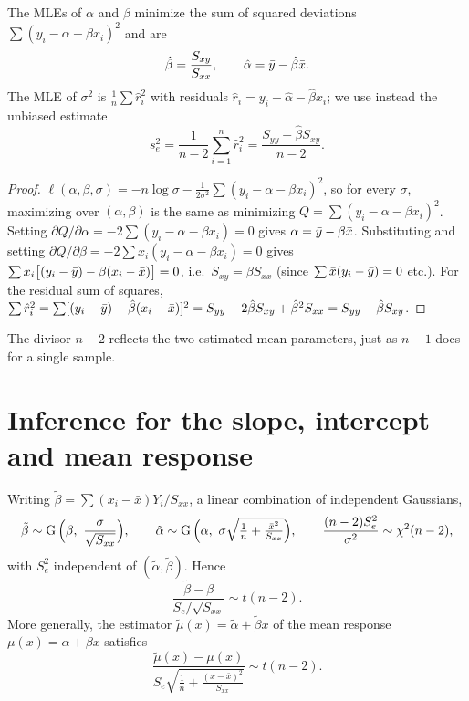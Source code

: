 \begin{theorem}[Least squares $=$ maximum likelihood]
The MLEs of $\alpha$ and $\beta$ minimize the sum of squared deviations
$\sum(y_i - \alpha-\beta x_i)^2$ and are
\[
\hat\beta = \frac{S_{xy}}{S_{xx}},\qquad \hat\alpha = \bar{y} - \hat\beta\bar x.
\]
The MLE of $\sigma^2$ is $\frac1n\sum \hat r_i^2$ with residuals
$\hat r_i = y_i - \hat\alpha - \hat\beta x_i$; we use instead the unbiased estimate
\[
s_e^2 = \frac{1}{n-2}\sum_{i=1}^n \hat r_i^2 = \frac{S_{yy} - \hat\beta S_{xy}}{n-2}.
\]
\end{theorem}
\begin{proof}
$\ell(\alpha,\beta,\sigma) = -n\log\sigma - \frac{1}{2\sigma^2}\sum(y_i-\alpha-\beta x_i)^2$,
so for every $\sigma$, maximizing over $(\alpha,\beta)$ is the same as minimizing
$Q = \sum(y_i-\alpha-\beta x_i)^2$. Setting
$\partial Q/\partial\alpha = -2\sum(y_i-\alpha-\beta x_i) = 0$ gives $\alpha = \bar{y} - \beta\bar x$.
Substituting and setting $\partial Q/\partial\beta = -2\sum x_i(y_i-\alpha-\beta x_i) = 0$
gives $\sum x_i\big[(y_i-\bar{y}) - \beta(x_i-\bar x)\big] = 0$, i.e.\ $S_{xy} = \beta S_{xx}$
(since $\sum\bar x(y_i-\bar{y}) = 0$ etc.). For the residual sum of squares,
$\sum\hat r_i^2 = \sum[(y_i-\bar{y})-\hat\beta(x_i-\bar x)]^2 = S_{yy} - 2\hat\beta S_{xy} +
\hat\beta^2S_{xx} = S_{yy}-\hat\beta S_{xy}$.
\end{proof}

The divisor $n-2$ reflects the two estimated mean parameters, just as $n-1$ does for
a single sample.

\section{Inference for the slope, intercept and mean response}

\begin{theorem}
Writing $\tilde\beta = \sum (x_i-\bar x)Y_i/S_{xx}$, a linear combination of independent
Gaussians,
\[
\tilde\beta\sim\Gau\Big(\beta,\ \frac{\sigma}{\sqrt{S_{xx}}}\Big),\qquad
\tilde\alpha\sim\Gau\Big(\alpha,\ \sigma\sqrt{\tfrac1n + \tfrac{\bar x^2}{S_{xx}}}\Big),
\qquad
\frac{(n-2)S_e^2}{\sigma^2}\sim\chi^2(n-2),
\]
with $S_e^2$ independent of $(\tilde\alpha,\tilde\beta)$. Hence
\[
\frac{\tilde\beta-\beta}{S_e/\sqrt{S_{xx}}}\sim t(n-2).
\]
More generally, the estimator $\tilde\mu(x) = \tilde\alpha+\tilde\beta x$ of the mean
response $\mu(x) = \alpha+\beta x$ satisfies
\[
\frac{\tilde\mu(x)-\mu(x)}{S_e\sqrt{\frac1n + \frac{(x-\bar x)^2}{S_{xx}}}}\sim t(n-2).
\]
\end{theorem}

